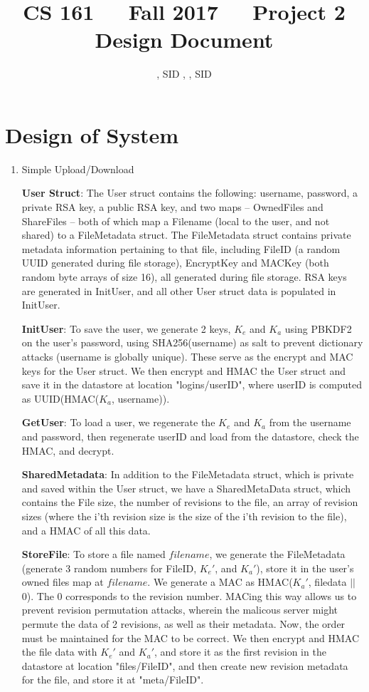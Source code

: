 \documentclass[11pt]{article}
\title{CS 161\ \ \ Fall 2017\ \ \ Project 2 Design Document}
\author{\NameA, SID \SIDA, \NameB, SID \SIDB}
\date{}
\begin{document}
\maketitle

\section{Design of System}
\begin{enumerate}
\item{Simple Upload/Download}

\textbf{User Struct}: The User struct contains the following: username, password, a private RSA key, a public RSA key, and two maps -- OwnedFiles and ShareFiles -- both of which map a Filename (local to the user, and not shared) to a FileMetadata struct. The FileMetadata struct contains private metadata information pertaining to that file, including FileID (a random UUID generated during file storage), EncryptKey and MACKey (both random byte arrays of size 16), all generated during file storage. RSA keys are generated in InitUser, and all other User struct data is populated in InitUser.

\textbf{InitUser}: To save the user, we generate 2 keys, $K_e$ and $K_a$ using PBKDF2 on the user's password, using SHA256(username) as salt to prevent dictionary attacks (username is globally unique). These serve as the encrypt and MAC keys for the User struct. We then encrypt and HMAC the User struct and save it in the datastore at location "logins/userID", where userID is computed as UUID(HMAC($K_a$, username)).

\textbf{GetUser}: To load a user, we regenerate the $K_e$ and $K_a$ from the username and password, then regenerate userID and load from the datastore, check the HMAC, and decrypt.

\textbf{SharedMetadata}: In addition to the FileMetadata struct, which is private and saved within the User struct, we have a SharedMetaData struct, which contains the File size, the number of revisions to the file, an array of revision sizes (where the i'th revision size is the size of the i'th revision to the file), and a HMAC of all this data.

\textbf{StoreFile}: To store a file named $filename$, we generate the FileMetadata (generate 3 random numbers for FileID, $K_e'$, and $K_a'$), store it in the user's owned files map at $filename$. We generate a MAC as HMAC($K_a'$, filedata $||$\ $0$). The $0$ corresponds to the revision number. MACing this way allows us to prevent revision permutation attacks, wherein the malicous server might permute the data of 2 revisions, as well as their metadata. Now, the order must be maintained for the MAC to be correct. We then encrypt and HMAC the file data with $K_e'$ and $K_a'$, and store it as the first revision in the datastore at location "files/FileID", and then create new revision metadata for the file, and store it at "meta/FileID".


\end{enumerate}
\end{document}
